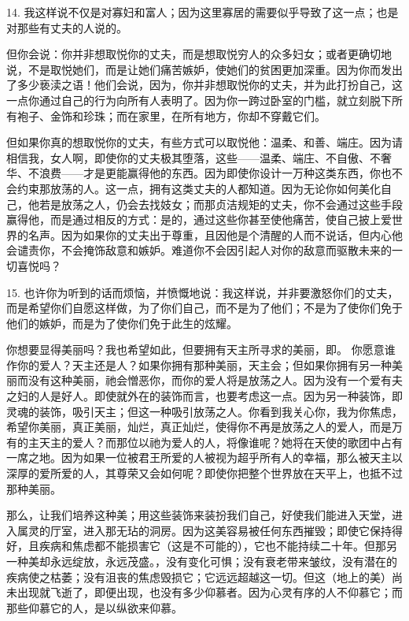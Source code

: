 14. 我这样说不仅是对寡妇和富人；因为这里寡居的需要似乎导致了这一点；也是对那些有丈夫的人说的。\par

但你会说：你并非想取悦你的丈夫，而是想取悦穷人的众多妇女；或者更确切地说，不是取悦她们，而是让她们痛苦嫉妒，使她们的贫困更加深重。因为你而发出了多少亵渎之语！他们会说，因为，你并非想取悦你的丈夫，并为此打扮自己，这一点你通过自己的行为向所有人表明了。因为你一跨过卧室的门槛，就立刻脱下所有袍子、金饰和珍珠；而在家里，在所有地方，你却不穿戴它们。\par

但如果你真的想取悦你的丈夫，有些方式可以取悦他：温柔、和善、端庄。因为请相信我，女人啊，即使你的丈夫极其堕落，这些——温柔、端庄、不自傲、不奢华、不浪费——才是更能赢得他的东西。因为即使你设计一万种这类东西，你也不会约束那放荡的人。这一点，拥有这类丈夫的人都知道。因为无论你如何美化自己，他若是放荡之人，仍会去找妓女；而那贞洁规矩的丈夫，你不会通过这些手段赢得他，而是通过相反的方式：是的，通过这些你甚至使他痛苦，使自己披上爱世界的名声。因为如果你的丈夫出于尊重，且因他是个清醒的人而不说话，但内心他会谴责你，不会掩饰敌意和嫉妒。难道你不会因引起人对你的敌意而驱散未来的一切喜悦吗？\par

15. 也许你为听到的话而烦恼，并愤慨地说：我这样说，并非要激怒你们的丈夫，而是希望你们自愿这样做，为了你们自己，而不是为了他们；不是为了使你们免于他们的嫉妒，而是为了使你们免于此生的炫耀。\par

你想要显得美丽吗？我也希望如此，但要拥有天主所寻求的美丽，即。 你愿意谁作你的爱人？天主还是人？如果你拥有那种美丽，天主会；但如果你拥有另一种美丽而没有这种美丽，祂会憎恶你，而你的爱人将是放荡之人。因为没有一个爱有夫之妇的人是好人。即使就外在的装饰而言，也要考虑这一点。因为另一种装饰，即灵魂的装饰，吸引天主；但这一种吸引放荡之人。你看到我关心你，我为你焦虑，希望你美丽，真正美丽，灿烂，真正灿烂，使得你不再是放荡之人的爱人，而是万有的主天主的爱人？而那位以祂为爱人的人，将像谁呢？她将在天使的歌团中占有一席之地。因为如果一位被君王所爱的人被视为超乎所有人的幸福，那么被天主以深厚的爱所爱的人，其尊荣又会如何呢？即使你把整个世界放在天平上，也抵不过那种美丽。\par

那么，让我们培养这种美；用这些装饰来装扮我们自己，好使我们能进入天堂，进入属灵的厅室，进入那无玷的洞房。因为这美容易被任何东西摧毁；即使它保持得好，且疾病和焦虑都不能损害它（这是不可能的），它也不能持续二十年。但那另一种美却永远绽放，永远茂盛。，没有变化可惧；没有衰老带来皱纹，没有潜在的疾病使之枯萎；没有沮丧的焦虑毁损它；它远远超越这一切。但这（地上的美）尚未出现就飞逝了，即便出现，也没有多少仰慕者。因为心灵有序的人不仰慕它；而那些仰慕它的人，是以纵欲来仰慕。\par

